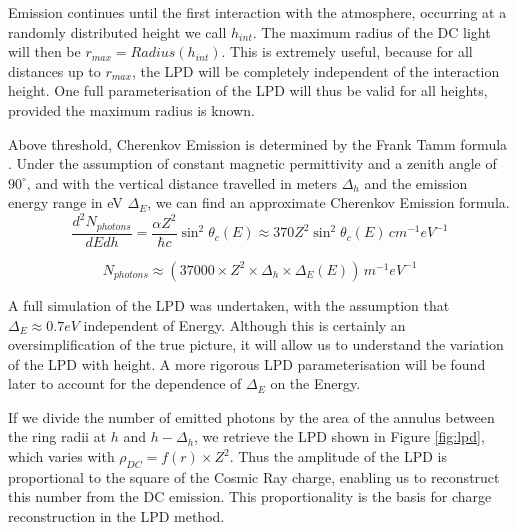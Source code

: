 \documentclass[11pt]{article}
\begin{document}
Emission continues until the first interaction with the atmosphere, occurring at a randomly distributed height we call $h_{int}$. The maximum radius of the DC light will then be $r_{max} = Radius(h_{int})$. This is extremely useful, because for all distances up to $r_{max}$, the LPD will be completely independent of the interaction height. One full parameterisation of the LPD will thus be valid for all heights, provided the maximum radius is known.

Above threshold, Cherenkov Emission is determined by the Frank Tamm formula \cite{ppreview}.  Under the assumption of constant magnetic permittivity and a zenith angle of $90^{\circ}$, and with  the vertical distance travelled in meters $\Delta_{h}$ and the emission energy range in eV $\Delta_{E}$, we can find an approximate Cherenkov Emission formula.
\[ \frac{d^{2}N_{photons}}{dEdh} = \frac{\alpha Z^{2}}{\hbar c} \sin^{2} \theta_{c}(E) \approx 370 Z^{2} \sin^{2} \theta_{c}(E)\, cm^{-1}eV^{-1} \]

\[ N_{photons} \approx (37000 \times Z^{2} \times \Delta_{h} \times \Delta_{E}(E))\, m^{-1}eV^{-1}\]
 
A full simulation of the LPD was undertaken, with the assumption that $\Delta_{E} \approx 0.7 eV$ independent of Energy. Although this is certainly an oversimplification of the true picture, it will allow us to understand the variation of the LPD with height. A more rigorous LPD parameterisation will be found later to account for the dependence of $\Delta_{E}$ on the Energy. 

If we divide the number of emitted photons by the area of the annulus between the ring radii at $h$ and $h - \Delta_{h}$, we retrieve the LPD shown in Figure \ref{fig:lpd}, which varies with $ \rho_{DC}  = f(r) \times Z^{2}$. Thus the amplitude of the LPD is proportional to the square of the Cosmic Ray charge, enabling us to reconstruct this number from the DC emission. This proportionality is the basis for charge reconstruction in the LPD method.
\end{document}
